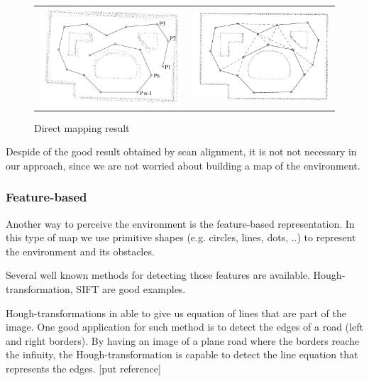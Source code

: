 \begin{figure}[h]
\centering
	\begin{tabular}{lr}\\
		\includegraphics[width=0.5\columnwidth]{img/fig:mapping:direct:a} &
		\includegraphics[width=0.5\columnwidth]{img/fig:mapping:direct:b}
	\end{tabular}
	\caption{Direct mapping result}
	\label{fig:mapping:direct:result}
\end{figure}

Despide of the good result obtained by scan alignment, it is not not necessary in our approach, since we are not worried about building a map of the environment. 

\subsubsection{Feature-based}

Another way to perceive the environment is the feature-based representation. In this type of map we use primitive shapes (e.g. circles, lines, dots, ..) to represent the environment and its obstacles.

Several well known methods for detecting those features are available. Hough-transformation, SIFT are good examples. 

Hough-transformations in able to give us equation of lines that are part of the image. One good application for such method is to detect the edges of a road (left and right borders). By having an image of a plane road where the borders reache the infinity, the Hough-transformation is capable to detect the line equation that represents the edges. [put reference]


